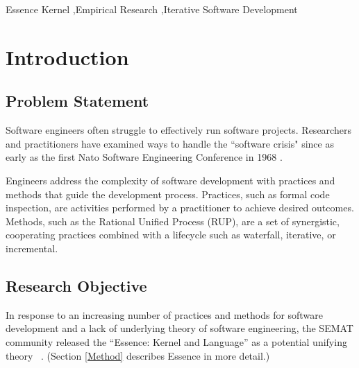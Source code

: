 \documentclass[preprint,12pt,3p]{elsarticle}
\begin{document}
\begin{frontmatter}
\begin{abstract}

\end{abstract}

\begin{keyword}
Essence Kernel \sep Empirical Research \sep Iterative Software Development
\end{keyword}

\end{frontmatter}


\section{Introduction}

\subsection{Problem Statement}
Software engineers often struggle to effectively run software projects. Researchers and practitioners have examined ways to handle the ``software crisis" since as early as the first Nato Software Engineering Conference in 1968 \cite{Naur1969}. 

Engineers address the complexity of software development with practices and methods that guide the development process. Practices, such as formal code inspection, are activities performed by a practitioner to achieve desired outcomes. Methods, such as the Rational Unified Process (RUP), are a set of synergistic, cooperating practices combined with a lifecycle such as waterfall, iterative, or incremental.

\subsection{Research Objective}
In response to an increasing number of practices and methods for software development and a lack of underlying theory of software engineering, the SEMAT community released the “Essence: Kernel and Language” as a potential unifying theory  ~\cite{OMGStandard}. (Section \ref{Method} describes Essence in more detail.) 
\end{document}
